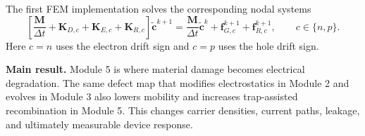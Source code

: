 \documentclass[11pt]{article}
\begin{document}
The first FEM implementation solves the corresponding nodal systems
\begin{equation}
    \left[\frac{\mathbf{M}}{\Delta t}+\mathbf{K}_{D,c}+\mathbf{K}_{E,c}+\mathbf{K}_{R,c}\right]\tilde{\mathbf{c}}^{k+1}
    =\frac{\mathbf{M}}{\Delta t}\tilde{\mathbf{c}}^{k}+\mathbf{f}_{G,c}^{k+1}+\mathbf{f}_{R,c}^{k+1},
    \qquad c\in\{n,p\}.
\end{equation}
Here \(c=n\) uses the electron drift sign and \(c=p\) uses the hole drift sign.

\begin{physicsbox}
\textbf{Main result.} Module 5 is where material damage becomes electrical degradation. The same defect map that modifies electrostatics in Module 2 and evolves in Module 3 also lowers mobility and increases trap-assisted recombination in Module 5. This changes carrier densities, current paths, leakage, and ultimately measurable device response.
\end{physicsbox}
\end{document}
